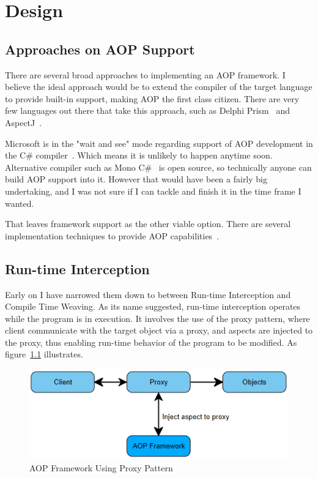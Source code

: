 \chapter{Design}

\section{Approaches on AOP Support}

There are several broad approaches to implementing an AOP framework. I believe the ideal approach would be to extend the compiler of the target language to provide built-in support, making AOP the first class citizen. There are very few languages out there that take this approach, such as Delphi Prism~\cite{delphi_prism2010} and AspectJ~\cite{aspectj_faq, aspectj_text}. 

Microsoft is in the "wait and see" mode regarding support of AOP development in the C\# compiler~\cite{hejlsberg}. Which means it is unlikely to happen anytime soon. Alternative compiler such as Mono C\#~\cite{monocsharp} is open source, so technically anyone can build AOP support into it. However that would have been a fairly big undertaking, and I was not sure if I can tackle and finish it in the time frame I wanted.

That leaves framework support as the other viable option. There are several implementation techniques to provide AOP capabilities~\cite{aopcs, postsharp, aspectcs}.

\section{Run-time Interception}

Early on I have narrowed them down to between Run-time Interception and Compile Time Weaving. As its name suggested, run-time interception operates while the program is in execution. It involves the use of the proxy pattern, where client communicate with the target object via a proxy, and aspects are injected to the proxy, thus enabling run-time behavior of the program to be modified. As figure~\ref{proxy_model} illustrates.

\begin{figure}[H]
  \includegraphics[scale=1.0]{Proxy.PNG}
  \centering
  \caption{AOP Framework Using Proxy Pattern\label{proxy_model}}
\end{figure}

